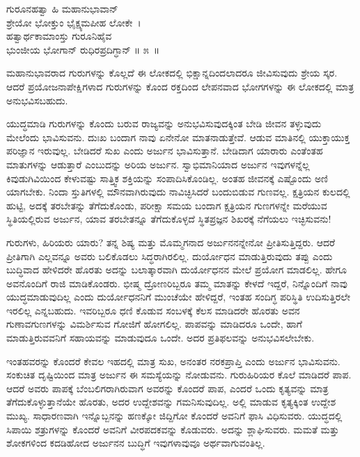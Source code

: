 \begin{shloka}
ಗುರೂನಹತ್ವಾ ಹಿ ಮಹಾನುಭಾವಾನ್​\\ಶ್ರೇಯೋ ಭೋಕ್ತುಂ ಭೈಕ್ಷ್ಯಮಪೀಹ ಲೋಕೇ~।\\ಹತ್ವಾರ್ಥಕಾಮಾಂಸ್ತು ಗುರೂನಿಹೈವ\\ಭುಂಜೀಯ ಭೋಗಾನ್ ರುಧಿರಪ್ರದಿಗ್ಧಾನ್ \hfill॥ ೫~॥
\end{shloka}

\begin{artha}
ಮಹಾನುಭಾವರಾದ ಗುರುಗಳನ್ನು ಕೊಲ್ಲದೆ ಈ ಲೋಕದಲ್ಲಿ ಭಿಕ್ಷಾನ್ನದಿಂದಲಾದರೂ ಜೀವಿಸುವುದು ಶ್ರೇಯ ಸ್ಕರ. ಆದರೆ ಪ್ರಯೋಜನಾಪೇಕ್ಷಿಗಳಾದ ಗುರುಗಳನ್ನು ಕೊಂದ ರಕ್ತದಿಂದ ಲೇಪನವಾದ ಭೋಗಗಳನ್ನು ಈ ಲೋಕದಲ್ಲಿ ಮಾತ್ರ ಅನುಭವಿಸಬಹುದು.
\end{artha}

ಯುದ್ಧಮಾಡಿ ಗುರುಗಳನ್ನು ಕೊಂದು ಬರುವ ರಾಜ್ಯವನ್ನು ಅನುಭವಿಸುವುದಕ್ಕಿಂತ ಬೇಡಿ ಜೀವನ ತಳ್ಳುವುದು ಮೇಲೆಂದು ಭಾವಿಸುವನು. ದುಃಖ ಬಂದಾಗ ನಾವು ಏನೇನೋ ಮಾತನಾಡುತ್ತೇವೆ. ಆಡುವ ಮಾತಿನಲ್ಲಿ ಯುಕ್ತಾಯುಕ್ತ ಪರಿಜ್ಞಾನ ಇರುವುಲ್ಲ. ಬೇಡಿದರೆ ಸುಖ ಎಂದು ಅರ್ಜುನ ಭಾವಿಸುತ್ತಾನೆ. ಬೇಡಿದಾಗ ಯಾರಾರು ಎಂತೆಂತಹ ಮಾತುಗಳನ್ನು ಆಡುತ್ತಾರೆ ಎಂಬುದನ್ನು ಅರಿಯ ಅರ್ಜುನ. ಸ್ವಾಭಿಮಾನಿಯಾದ ಅರ್ಜುನ ಇವುಗಳನ್ನೆಲ್ಲ ಕಿವುಡುಗಿವಿಯಿಂದ ಕೇಳುವಷ್ಟು ಸಾತ್ತ್ವಿಕ ಶಕ್ತಿಯನ್ನು ಸಂಪಾದಿಸಿಕೊಂಡಿಲ್ಲ. ಅಂತಹ ಜೀವನಕ್ಕೆ ಎಷ್ಟೊಂದು ಅಣಿ ಯಾಗಬೇಕು. ನಿಂದಾ ಸ್ತುತಿಗಳಲ್ಲಿ ಮೌನವಾಗಿರುವುದು ನಾವಿಚ್ಛಿಸಿದರೆ ಬಂದುಬಿಡುವ ಗುಣವಲ್ಲ. ಕ್ಷತ್ರಿಯನ ಕುಲದಲ್ಲಿ ಹುಟ್ಟಿ, ಅದಕ್ಕೆ ತರಬೇತನ್ನು ತೆಗೆದುಕೊಂಡು, ಪರೀಕ್ಷಾ ಸಮಯ ಬಂದಾಗ ಕ್ಷತ್ರಿಯನ ಗುಣಗಳನ್ನೇ ಮರೆಯುವ ಸ್ಥಿತಿಯಲ್ಲಿರುವ ಅರ್ಜುನ, ಯಾವ ತರಬೇತನ್ನೂ ತೆಗೆದುಕೊಳ್ಳದೆ ಸ್ಥಿತಪ್ರಜ್ಞನ ಶಿಖರಕ್ಕೆ ನೆಗೆಯಲು ಇಚ್ಛಿಸುವನು!

ಗುರುಗಳು, ಹಿರಿಯರು ಯಾರು? ತನ್ನ ಶಿಷ್ಯ ಮತ್ತು ಮೊಮ್ಮಗನಾದ ಅರ್ಜುನನನ್ನೇನೋ ಪ್ರೀತಿಸುತ್ತಿದ್ದರು. ಆದರೆ ಪ್ರೀತಿಗಾಗಿ ಎಲ್ಲವನ್ನೂ ಅವರು ಬಲಿಕೊಡಲು ಸಿದ್ಧರಾಗಿರಲಿಲ್ಲ. ದುರ್ಯೋಧನ ಮಾಡುತ್ತಿರುವುದು ತಪ್ಪು ಎಂದು ಬುದ್ಧಿವಾದ ಹೇಳಿದರೇ ಹೊರತು ಅದನ್ನು ಬಲಾತ್ಕಾರವಾಗಿ ದುರ್ಯೋಧನನ ಮೇಲೆ ಪ್ರಯೋಗ ಮಾಡಲಿಲ್ಲ. ಹೇಗೂ ಅವನೊಂದಿಗೆ ರಾಜಿ ಮಾಡಿಕೊಂಡರು. ಭೀಷ್ಮ ದ್ರೋಣರಿಬ್ಬರೂ ತಮ್ಮ ಮಾತನ್ನು ಕೇಳದೆ ಇದ್ದರೆ, ನಿನ್ನೊಂದಿಗೆ ನಾವು ಯುದ್ಧಮಾಡುವುದಿಲ್ಲ ಎಂದು ದುರ್ಯೋಧನನಿಗೆ ಮುಂಚೆಯೇ ಹೇಳಿದ್ದರೆ, ಇಂತಹ ಸಂದಿಗ್ಧ ಪರಿಸ್ಥಿತಿ ಉದಿಸುತ್ತಿರಲೇ ಇರಲಿಲ್ಲ ಎನ್ನಬಹುದು. ಇವರಿಬ್ಬರೂ ಧಣಿ ಕೊಡುವ ಸಂಬಳಕ್ಕೆ ಕೆಲಸ ಮಾಡಿದರೇ ಹೊರತು ಅವನ ಗುಣಾವಗುಣಗಳನ್ನು ವಿಮರ್ಶಿಸುವ ಗೋಜಿಗೆ ಹೋಗಲಿಲ್ಲ. ಪಾಪವನ್ನು ಮಾಡಿದರೂ ಒಂದೇ, ಹಾಗೆ ಮಾಡುತ್ತಿರುವವನಿಗೆ ಸಹಾಯವನ್ನು ಮಾಡುವುದೂ ಒಂದೇ. ಅದರ ಪ್ರತಿಫಲವನ್ನು ಅನುಭವಿಸಲೇಬೇಕು.

ಇಂತಹವರನ್ನು ಕೊಂದರೆ ಕೇವಲ ಇಹದಲ್ಲಿ ಮಾತ್ರ ಸುಖ, ಅನಂತರ ನರಕಪ್ರಾಪ್ತಿ ಎಂದು ಅರ್ಜುನ ಭಾವಿಸುವನು. ಸಂಕುಚಿತ ದೃಷ್ಟಿಯಿಂದ ಮಾತ್ರ ಅರ್ಜುನ ಈ ಸಮಸ್ಯೆಯನ್ನು ನೋಡುವನು. ಗುರುಹಿರಿಯರ ಕೊಲೆ ಮಾಡಿದರೆ ಪಾಪ. ಆದರೆ ಅವರು ಪಾಪಕ್ಕೆ ಬೆಂಬಲಿಗ\-ರಾಗಿರುವಾಗ ಅವರನ್ನು ಕೊಂದರೆ ಪಾಪ, ಎಂದರೆ ಒಂದು ಕೃತ್ಯವನ್ನು ಮಾತ್ರ ತೆಗೆದುಕೊಳ್ಳು\-ತ್ತಾನೆಯೇ ಹೊರತು, ಅದರ ಉದ್ದೇಶವನ್ನು ಗಮನಿಸುವುದಿಲ್ಲ. ಅಲ್ಲಿ ಮಾಡುವ ಕೃತ್ಯಕ್ಕಿಂತ ಉದ್ದೇಶ ಮುಖ್ಯ. ಸಾಧಾರಣವಾಗಿ ಇನ್ನೊಬ್ಬನನ್ನು ಹಣಕ್ಕೋ ಜಿದ್ದಿಗೋ ಕೊಂದರೆ ಅವನಿಗೆ ಫಾಸಿ ವಿಧಿಸುವರು. ಯುದ್ಧದಲ್ಲಿ ಸಿಪಾಯಿ ಶತ್ರುಗಳನ್ನು ಕೊಂದರೆ ಅವನಿಗೆ ವೀರಪದಕವನ್ನು ಕೊಡುವರು. ಅದನ್ನು ಶ್ಲಾಘಿಸುವರು. ಮಮತೆ ಮತ್ತು ಶೋಕಗಳಿಂದ ಕದಡಿಹೋದ ಅರ್ಜುನನ ಬುದ್ಧಿಗೆ ಇವುಗಳಾವುವೂ ಅರ್ಥವಾಗುವಂತಿಲ್ಲ.

